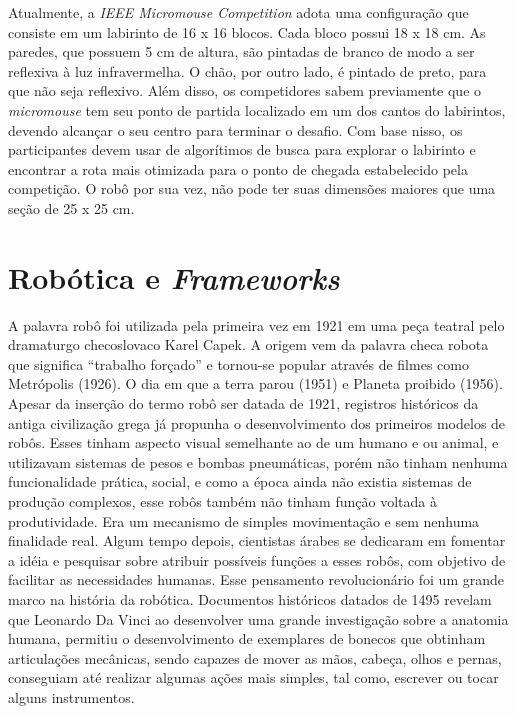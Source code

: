 \hspace{0.5cm} Atualmente, a \textit{IEEE Micromouse Competition} adota uma configuração que consiste em um labirinto de 16 x 16 blocos. Cada bloco possui 18 x 18 cm. As paredes, que possuem 5 cm de altura, são pintadas de branco de modo a ser reflexiva à luz infravermelha. O chão, por outro lado, é pintado de preto, para que não seja reflexivo. Além disso, os competidores sabem previamente que o \textit{micromouse} tem seu ponto de partida localizado em um dos cantos do labirintos, devendo alcançar o seu centro para terminar o desafio. Com base nisso, os participantes devem usar de algorítimos de busca para explorar o labirinto e encontrar a rota mais otimizada para o ponto de chegada estabelecido pela competição. O robô por sua vez, não pode ter suas dimensões maiores que uma seção de 25 x 25 cm. 

\section{Robótica e \textit{Frameworks}}
\label{sec:robotic_frameworks}
A palavra robô foi utilizada pela primeira vez em 1921 em uma peça teatral pelo dramaturgo checoslovaco Karel Capek. A origem vem da palavra checa robota que significa “trabalho forçado” e tornou-se popular através de filmes como Metrópolis (1926). O dia em que a terra parou (1951) e Planeta proibido (1956). Apesar da inserção do termo robô ser datada de 1921, registros históricos da antiga civilização grega já propunha o desenvolvimento dos primeiros modelos de robôs. Esses tinham aspecto visual semelhante ao de um humano e ou animal, e utilizavam sistemas de pesos e bombas pneumáticas, porém não tinham nenhuma funcionalidade prática, social, e como a época ainda não existia sistemas de produção complexos, esse robôs também não tinham função voltada à produtividade. Era um mecanismo de simples movimentação e sem nenhuma finalidade real. Algum tempo depois, cientistas árabes se dedicaram em fomentar a idéia e pesquisar sobre atribuir possíveis funções a esses robôs, com objetivo de facilitar as necessidades humanas. Esse pensamento revolucionário foi um grande marco na história da robótica. Documentos históricos datados de 1495 revelam que Leonardo Da Vinci ao desenvolver uma grande investigação sobre a anatomia humana, permitiu o desenvolvimento de exemplares de bonecos que obtinham articulações mecânicas, sendo capazes de mover as mãos, cabeça, olhos e pernas, conseguiam até realizar algumas ações mais simples, tal como, escrever ou tocar alguns instrumentos.

